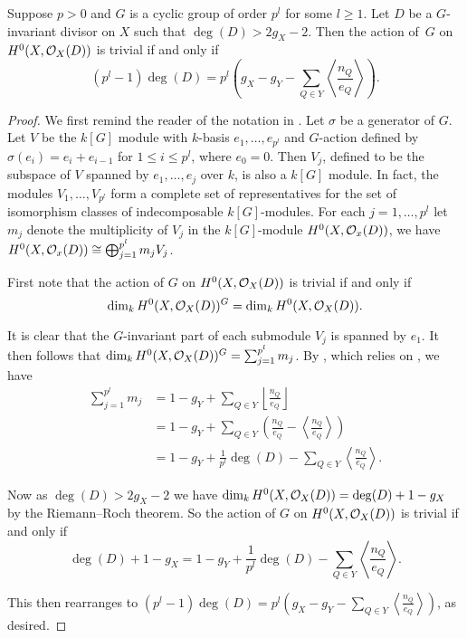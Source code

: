     \begin{prop}\label{nakaj}
    Suppose $p>0$ and $G$ is a cyclic group of order $p^l$ for some $l\geq 1$.
    Let $D$ be a $G$-invariant divisor on $X$ such that $\deg(D)>2g_X-2$.
    Then the action of~$G$ on $H^0(X,{\cal O}_X(D))$ is trivial if and only if
        \[ 
        (p^l-1)\deg(D)=p^l\left(g_X-g_Y-\sum_{Q\in Y}\left\langle \frac{n_Q}{e_Q} \right\rangle\right).
        \]
    \end{prop}
    \begin{proof}
    We first remind the reader of the notation in \cite{kako}.
    Let $\sigma$ be a generator of $G$.
    Let $V$ be the $k[G]$ module with $k$-basis $e_1,\ldots ,e_{p^l}$ and $G$-action defined by $\sigma( e_i)=e_i+e_{i-1}$ for $1\leq i \leq p^l$, where $e_0=0$.
    Then $V_j$, defined to be the subspace of $V$ spanned by $e_1,\ldots ,e_j$ over $k$, is also a $k[G]$ module.
    In fact, the modules $V_1,\ldots ,V_{p^l}$ form a complete set of representatives for the set of isomorphism classes of indecomposable $k[G]$-modules. For each $j=1,\ldots,p^l$ let $m_j$ denote the multiplicity of $V_j$ in the $k[G]$-module $H^0(X,{\cal O}_x(D))$, \ie we have $H^0(X,{\cal O}_x(D))\cong \bigoplus_{j=1}^{p^l}m_jV_j$.
    
    
    
    First note that the action of $G$ on $H^0(X,{\cal O}_X(D))$ is trivial if and only if
        \begin{equation}\label{triva}
        \dim_k H^0(X,{\cal O}_X(D))^G =\dim_k H^0(X,{\cal O}_X(D)).
        \end{equation}
    
    It is clear that the $G$-invariant part of each submodule $V_j$ is spanned by $e_1$. 
    It then follows that $\dim_kH^0(X,{\cal O}_X(D))^G = \sum_{j=1}^{p^l} m_j$.
    By \cite[Thm.\ 2.1]{quaddiffequi}, which relies on \cite{cohogsheaves}, we have
        \begin{align*}
        \sum_{j=1}^{p^l} m_j & =  1- g_Y +\sum_{Q\in Y} \left\lfloor \frac{n_Q}{e_Q}\right\rfloor\\
        & =  1- g_Y + \sum_{Q\in Y} \left( \frac{n_Q}{e_Q} - \left\langle \frac{n_Q}{e_Q}\right\rangle \right) \\
        & =  1 - g_Y + \frac{1}{p^l}\deg(D) - \sum_{Q\in Y} \left\langle \frac{n_Q}{e_Q} \right\rangle.
        \end{align*}
    
    Now as $\deg(D)>2g_X-2$ we have $\dim_kH^0(X,{\cal O}_X(D)) =\deg(D)+1-g_X$ by the Riemann--Roch theorem. 
    So the action of $G$ on $H^0(X,{\cal O}_X(D))$ is trivial if and only if
        \begin{equation*}
        \deg(D)+1-g_X  = 1 - g_Y + \frac{1}{p^l}\deg(D) - \sum_{Q\in Y}\left\langle \frac{n_Q}{e_Q} \right\rangle. \label{hi}
        \end{equation*}
    
    This then rearranges to $(p^l-1)\deg(D)=p^l\left(g_X-g_Y-\sum_{Q\in Y}\left\langle \frac{n_Q}{e_Q} \right\rangle\right)$, as desired.
    \end{proof}

